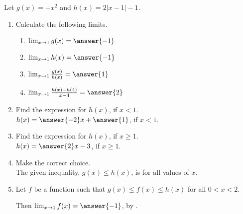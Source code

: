 \documentclass{ximera}
\author{Nela Lakos \and Kyle Parsons}
\begin{document}
\begin{exercise}

Let $g(x) = -x^2$ and $h(x) =  2\left|x-1\right|-1$.
\begin{enumerate}
\item Calculate the following limits.\\[1em]
\begin{enumerate}
\item$\lim_{x\to1}g(x) = \answer{-1}$\\

\item $\lim_{x\to1}h(x)= \answer{-1}$\\

\item $\lim_{x\to1}\frac{g(x)}{h(x)} = \answer{1}$\\ 

\item $\lim_{x\to1}\frac{h(x)-h(4)}{x-4} = \answer{2}$\\

\end{enumerate}

\item Find the expression for $h(x)$, if $x<1$.\\

$h(x)=\answer{-2}x +\answer{1}$,  if $x<1$. \\

\item  Find the expression for $h(x)$, if $x\ge1$.\\

$h(x)=\answer{2}x -3$, if $x\ge1$.\\

\item Make the correct choice. \\
The given  inequality,   $g(x) \leq h(x)$,    is  for all values of $x$.\\
     
\item Let $f$ be a function such that $g(x) \leq f(x) \leq h(x)$ for all $0 < x < 2$.

Then $\lim_{x\to1}f(x) = \answer{-1}$, by  .

\end{enumerate}
\end{exercise}
\end{document}
